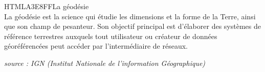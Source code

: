 \begin{colbox}{{HTML}{A3E8FF}}{La géodésie\\}
  La géodésie est la science qui étudie les dimensions et la forme de la Terre, ainsi que son champ de pesanteur. Son objectif principal est d’élaborer des systèmes de référence terrestres auxquels tout utilisateur ou créateur de données géoréférencées peut accéder par l’intermédiaire de réseaux.
  \begin{flushright}
  \textit{source : IGN (Institut Nationale de l'information Géographique)}
  \end{flushright}
\end{colbox}
